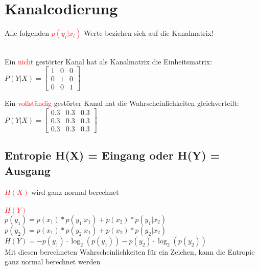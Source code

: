 
\section{Kanalcodierung}
Alle folgenden \textcolor{red}{$p(y_i|x_i)$} Werte beziehen sich auf die Kanalmatrix!\\\\
\begin{minipage}[t]{0.15\textwidth}
    Ein \textcolor{red}{nicht} gestörter Kanal hat als Kanalmatrix die Einheitsmatrix:\\
    $P(Y|X) = \begin{bmatrix}
                  1 & 0 & 0\\
                  0 & 1 & 0\\
                  0 & 0 & 1
    \end{bmatrix}$
\end{minipage}
\hfill
\begin{minipage}[t]{0.15\textwidth}
    Ein \textcolor{red}{vollständig} gestörter Kanal hat die Wahrscheinlichkeiten gleichverteilt:\\
    $P(Y|X) = \begin{bmatrix}
                  0.3 & 0.3 & 0.3\\
                  0.3 & 0.3 & 0.3\\
                  0.3 & 0.3 & 0.3
    \end{bmatrix}$
\end{minipage}


\subsection{Entropie H(X) = Eingang oder H(Y) = Ausgang}
\textcolor{red}{$H(X)$} wird ganz normal berechnet\\\\
\textcolor{red}{$H(Y)$} \\
\colorbox{lightlightgrey}{$p(y_1) = p(x_1)*p(y_1|x_1) + p(x_2)*p(y_1|x_2)$}\\
\colorbox{lightlightgrey}{$p(y_2) = p(x_1)*p(y_2|x_1) + p(x_2)*p(y_2|x_2)$}\\
\colorbox{lightlightgrey}{$H(Y) = -p(y_1) \cdot \log _{2}(p(y_1))-p(y_2) \cdot \log _{2}(p(y_2))$}\\

Mit diesen berechneten Wahrscheinlichkeiten für ein Zeichen, kann die Entropie ganz normal berechnet werden


